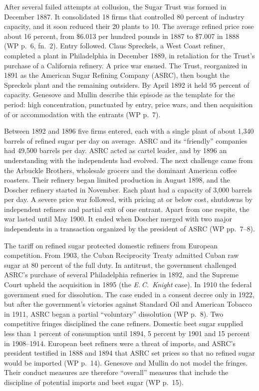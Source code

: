 After several failed attempts at collusion, the Sugar Trust was formed in December 1887. It consolidated 18
firms that controlled 80 percent of industry capacity, and it soon reduced their 20 plants to 10. The
average refined price rose about 16 percent, from \$6.013 per hundred pounds in 1887 to \$7.007 in 1888 (WP
p.~6, fn.~2). Entry followed. Claus Spreckels, a West Coast refiner, completed a plant in Philadelphia in
December 1889, in retaliation for the Trust's purchase of a California refinery. A price war ensued. The
Trust, reorganized in 1891 as the American Sugar Refining Company (ASRC), then bought the Spreckels plant
and the remaining outsiders. By April 1892 it held 95 percent of capacity. Genesove and Mullin describe this
episode as the template for the period: high concentration, punctuated by entry, price wars, and then
acquisition of or accommodation with the entrants (WP p.~7).

Between 1892 and 1896 five firms entered, each with a single plant of about 1,340 barrels of refined sugar
per day on average. ASRC and its ``friendly'' companies had 49,500 barrels per day. ASRC acted as cartel
leader, and by 1896 an understanding with the independents had evolved. The next challenge came from the
Arbuckle Brothers, wholesale grocers and the dominant American coffee roasters. Their refinery began limited
production in August 1898, and the Doscher refinery started in November. Each plant had a capacity of 3,000
barrels per day. A severe price war followed, with pricing at or below cost, shutdowns by independent
refiners and partial exit of one entrant. Apart from one respite, the war lasted until May 1900. It ended
when Doscher merged with two major independents in a transaction organized by the president of ASRC (WP
pp.~7--8).

The tariff on refined sugar protected domestic refiners from European competition. From 1903, the Cuban
Reciprocity Treaty admitted Cuban raw sugar at 80 percent of the full duty. In antitrust, the government
challenged ASRC's purchase of several Philadelphia refineries in 1892, and the Supreme Court upheld the
acquisition in 1895 (the \emph{E.\,C.~Knight} case). In 1910 the federal government sued for dissolution.
The case ended in a consent decree only in 1922, but after the government's victories against Standard Oil
and American Tobacco in 1911, ASRC began a partial ``voluntary'' dissolution (WP p.~8). Two competitive
fringes disciplined the cane refiners. Domestic beet sugar supplied less than 1 percent of consumption until
1894, 5 percent by 1901 and 15 percent in 1908--1914. European beet refiners were a threat of imports, and
ASRC's president testified in 1888 and 1894 that ASRC set prices so that no refined sugar would be imported
(WP p.~14). Genesove and Mullin do not model the fringes. Their conduct measures are therefore ``overall''
measures that include the discipline of potential imports and beet sugar (WP p.~15).


